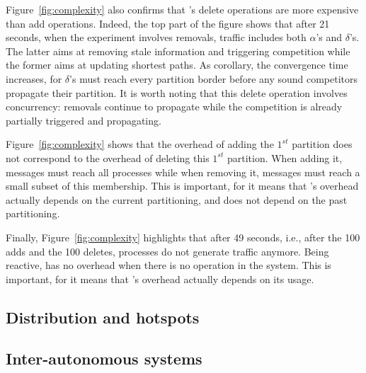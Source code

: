 \noindent Figure~\ref{fig:complexity} also confirms that \NAME's
delete operations are more expensive than add operations. Indeed, the
top part of the figure shows that after 21 seconds, when the
experiment involves removals, traffic includes both $\alpha$'s and
$\delta$'s. The latter aims at removing stale information and
triggering competition while the former aims at updating shortest
paths. As corollary, the convergence time increases, for $\delta$'s
must reach every partition border before any sound competitors
propagate their partition. It is worth noting that this delete
operation involves concurrency: removals continue to propagate while
the competition is already partially triggered and propagating.

\noindent Figure~\ref{fig:complexity} shows that the overhead of
adding the $1^{st}$ partition does not correspond to the overhead of
deleting this $1^{st}$ partition. When adding it, messages must reach
all processes while when removing it, messages must reach a small
subset of this membership. This is important, for it means that
\NAME's overhead actually depends on the current partitioning, and
does not depend on the past partitioning.

\noindent Finally, Figure~\ref{fig:complexity} highlights that after
49 seconds, i.e., after the 100 adds and the 100 deletes, processes do
not generate traffic anymore. Being reactive, \NAME has no overhead
when there is no operation in the system. This is important, for it
means that \NAME's overhead actually depends on its usage.

\subsection{Distribution and hotspots}


\subsection{Inter-autonomous systems}



